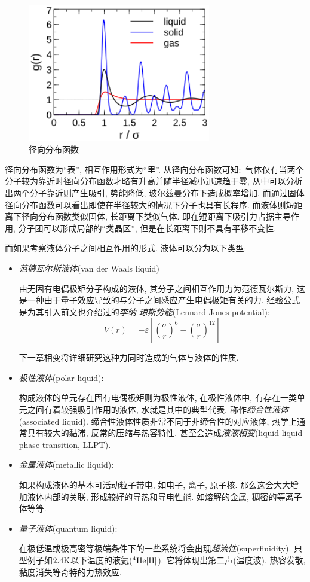 \begin{figure}
\vspace{-0.4cm}
\centering
\includegraphics[width=8cm]{image/5-3-8.png}
\caption{径向分布函数}\label{fig:rdf}
\end{figure}
径向分布函数为``表'', 相互作用形式为``里''. 从径向分布函数可知:\, 气体仅有当两个分子较为靠近时径向分布函数才略有升高并随半径减小迅速趋于零, 从中可以分析出两个分子靠近则产生吸引, 势能降低, 玻尔兹曼分布下造成概率增加. 而通过固体径向分布函数可以看出即使在半径较大的情况下分子也具有长程序. 而液体则短距离下径向分布函数类似固体, 长距离下类似气体. 即在短距离下吸引力占据主导作用, 分子团可以形成局部的``类晶区'', 但是在长距离下则不具有平移不变性.

而如果考察液体分子之间相互作用的形式. 液体可以分为以下类型:

\begin{itemize}
\item \emph{范德瓦尔斯液体}(van der Waals liquid)

由无固有电偶极矩分子构成的液体, 其分子之间相互作用力为范德瓦尔斯力, 这是一种由于量子效应导致的与分子之间感应产生电偶极矩有关的力. 经验公式是为其引入前文也介绍过的\emph{李纳-琼斯势能}(Lennard-Jones potential):
\[V(r)=-\varepsilon  \left[ \left( \frac{\sigma}{r} \right)^6- \left( \frac{\sigma}{r} \right)^{12}\right]  \]

下一章相变将详细研究这种力同时造成的气体与液体的性质.

\item \emph{极性液体}(polar liquid):

构成液体的单元存在固有电偶极矩则为极性液体, 在极性液体中, 有存在一类单元之间有着较强吸引作用的液体, 水就是其中的典型代表. 称作\emph{缔合性液体}(associated liquid). 缔合性液体性质非常不同于非缔合性的对应液体, 热学上通常具有较大的黏滞, 反常的压缩与热容特性. 甚至会造成\emph{液液相变}(liquid-liquid phase transition, LLPT).

\item \emph{金属液体}(metallic liquid):

如果构成液体的基本可活动粒子带电, 如电子, 离子, 原子核. 那么这会大大增加液体内部的关联, 形成较好的导热和导电性能. 如熔解的金属, 稠密的等离子体等等.

\item \emph{量子液体}(quantum liquid):

在极低温或极高密等极端条件下的一些系统将会出现\emph{超流性}(superfluidity). 典型例子如$2.4{\rm K}$以下温度的液氦(${\rm {}^4He[II]}$). 它将体现出第二声(温度波), 热容发散, 黏度消失等奇特的力热效应.

\end{itemize}

